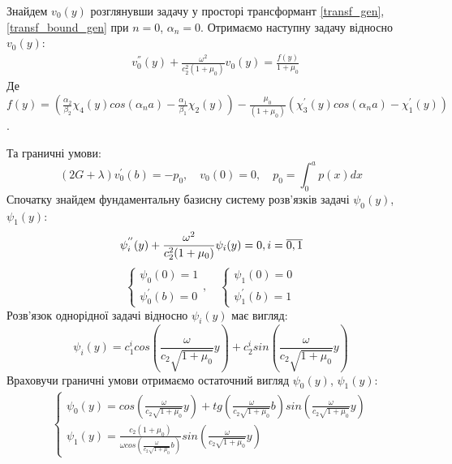 Знайдем $v_0(y)$ розглянувши задачу у просторі трансформант \eqref{transf_gen}, \eqref{transf_bound_gen} при $n=0$, $\alpha_n = 0$.
Отримаємо наступну задачу відносно $v_0(y)$:
\begin{align*}
    &v_0^{''}(y) + \frac{\omega^2}{c_2^2(1+\mu_0) }v_0(y) = \frac{f(y)}{1+\mu_0}
\end{align*}
Де $f(y)=(\frac{\alpha_2}{\beta_2}\chi_4(y) cos(\alpha_n a) - \frac{\alpha_1}{\beta_1}\chi_2(y)) - \frac{\mu_0}{(1+\mu_0)} (\chi_3^{'}(y) cos(\alpha_n a) -\chi_1^{'}(y))$.

Та граничні умови:
\begin{equation*}
    (2G + \lambda)v_0^{'}(b) = -p_0, \quad v_0(0) = 0, \quad p_0 = \int_{0}^{a}p(x)dx
\end{equation*}
Спочатку знайдем фундаментальну базисну систему розв'язків задачі $\psi_0(y)$, $\psi_1(y)$:
\begin{equation*}
    \psi_i^{''}(y) + \frac{\omega^2}{c_2^2(1+\mu_0) }\psi_i(y) = 0, i=\overline{0,1} \\
\end{equation*}
\begin{equation*}
    \begin{cases}
        \psi_0(0) = 1 \\
        \psi_0^{'}(b) = 0
    \end{cases}, \quad
    \begin{cases}
        \psi_1(0) = 0 \\
        \psi_1^{'}(b) = 1
    \end{cases}
\end{equation*}
Розв'язок однорідної задачі відносно $\psi_i(y)$ має вигляд:
\begin{equation}
    \psi_i(y) = c_1^i cos\left( \frac{\omega}{c_2 \sqrt{1 + \mu_0}} y \right) + c_2^i sin\left( \frac{\omega}{c_2 \sqrt{1 + \mu_0}} y \right)
\end{equation}
Враховучи граничні умови отримаємо остаточний вигляд $\psi_0(y)$, $\psi_1(y)$:
\begin{align*}
    \begin{cases}
        \psi_0(y) = cos\left( \frac{\omega}{c_2 \sqrt{1 + \mu_0}} y \right) +  tg\left( \frac{\omega}{c_2 \sqrt{1 + \mu_0}} b \right) sin\left( \frac{\omega}{c_2 \sqrt{1 + \mu_0}} y \right) \\
        \psi_1(y) = \frac{c_2 (1 + \mu_0)}{\omega cos\left( \frac{\omega}{c_2 \sqrt{1 + \mu_0}} b \right)} sin\left( \frac{\omega}{c_2 \sqrt{1 + \mu_0}} y \right)
    \end{cases}
\end{align*}
